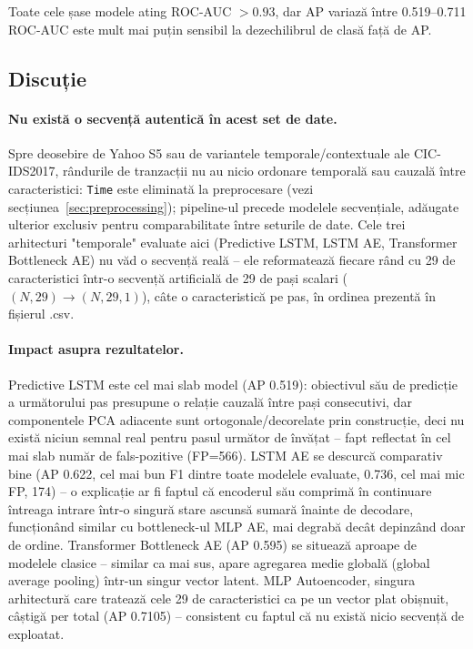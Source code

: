 Toate cele șase modele ating ROC-AUC $>0.93$, dar AP variază între 0.519--0.711 \rightarrow ROC-AUC este mult mai puțin sensibil la dezechilibrul de clasă față de AP.

\subsection{Discuție}

\paragraph{Nu există o secvență autentică în acest set de date.} Spre deosebire de Yahoo S5 sau de variantele temporale/contextuale ale CIC-IDS2017, rândurile de tranzacții nu au nicio ordonare temporală sau cauzală între caracteristici: \texttt{Time} este eliminată la preprocesare (vezi secțiunea~\ref{sec:preprocessing}); pipeline-ul precede modelele secvențiale, adăugate ulterior exclusiv pentru comparabilitate între seturile de date.
Cele trei arhitecturi "temporale" evaluate aici (Predictive LSTM, LSTM AE, Transformer Bottleneck AE) nu văd o secvență reală -- ele reformatează fiecare rând cu 29 de caracteristici într-o secvență artificială de 29 de pași scalari ($(N,29) \to (N,29,1)$), câte o caracteristică pe pas, în ordinea prezentă în fișierul .csv.

\paragraph{Impact asupra rezultatelor.} Predictive LSTM este cel mai slab model (AP 0.519): obiectivul său de predicție a următorului pas presupune o relație cauzală între pași consecutivi, dar componentele PCA adiacente sunt ortogonale/decorelate prin construcție, deci nu există niciun semnal real pentru pasul următor de învățat -- fapt reflectat în cel mai slab număr de fals-pozitive (FP=566). 
LSTM AE se descurcă comparativ bine (AP 0.622, cel mai bun F1 dintre toate modelele evaluate, 0.736, cel mai mic FP, 174) -- o explicație ar fi faptul că encoderul său comprimă în continuare întreaga intrare într-o singură stare ascunsă sumară înainte de decodare, funcționând similar cu bottleneck-ul MLP AE, mai degrabă decât depinzând doar de ordine. 
Transformer Bottleneck AE (AP 0.595) se situează aproape de modelele clasice -- similar ca mai sus, apare agregarea medie globală (global average pooling) într-un singur vector latent. 
MLP Autoencoder, singura arhitectură care tratează cele 29 de caracteristici ca pe un vector plat obișnuit, câștigă per total (AP 0.7105) -- consistent cu faptul că nu există nicio secvență de exploatat.

